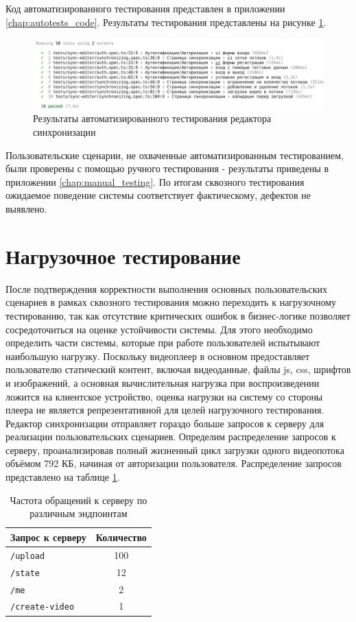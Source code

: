 	Код автоматизированного тестирования представлен в приложении \ref{chap:autotests_code}. Результаты тестирования представлены на рисунке \ref{fig:autotests}.

	\begin{figure}[ht!] 
		\center
		\includegraphics [scale=0.37] {my_folder/images//autotests}
		\caption{Результаты автоматизированного тестирования редактора синхронизации} 
		\label{fig:autotests}  
	\end{figure}

	Пользовательские сценарии, не охваченные автоматизированным тестированием, были проверены с помощью ручного тестирования - результаты приведены в приложении \ref{chap:manual_testing}. По итогам сквозного тестирования ожидаемое поведение системы соответствует фактическому, дефектов не выявлено.

\section{Нагрузочное тестирование}

	После подтверждения корректности выполнения основных пользовательских сценариев в рамках сквозного тестирования можно переходить к нагрузочному тестированию, так как отсутствие критических ошибок в бизнес-логике позволяет сосредоточиться на оценке устойчивости системы. Для этого необходимо определить части системы, которые при работе пользователей испытывают наибольшую нагрузку. Поскольку видеоплеер в основном предоставляет пользователю статический контент, включая видеоданные, файлы js, css, шрифтов и изображений, а основная вычислительная нагрузка при воспроизведении ложится на клиентское устройство, оценка нагрузки на систему со стороны плеера не является репрезентативной для целей нагрузочного тестирования. Редактор синхронизации отправляет гораздо больше запросов к серверу для реализации пользовательских сценариев. Определим распределение запросов к серверу, проанализировав полный жизненный цикл загрузки одного видеопотока объёмом 792 КБ, начиная от авторизации пользователя. Распределение запросов представлено на таблице \ref{tab:distr}.

	\begin{table}[h!]
		\centering
		\begin{tabular}{|l|c|}
			\hline
			\textbf{Запрос к серверу} & \textbf{Количество} \\
			\hline
			\texttt{/upload}         & 100 \\
			\hline
			\texttt{/state}          & 12 \\
			\hline
			\texttt{/me}             & 2 \\
			\hline
			\texttt{/create-video}   & 1 \\
			\hline
		\end{tabular}
		\caption{Частота обращений к серверу по различным эндпоинтам}
		\label{tab:distr}
	\end{table}

